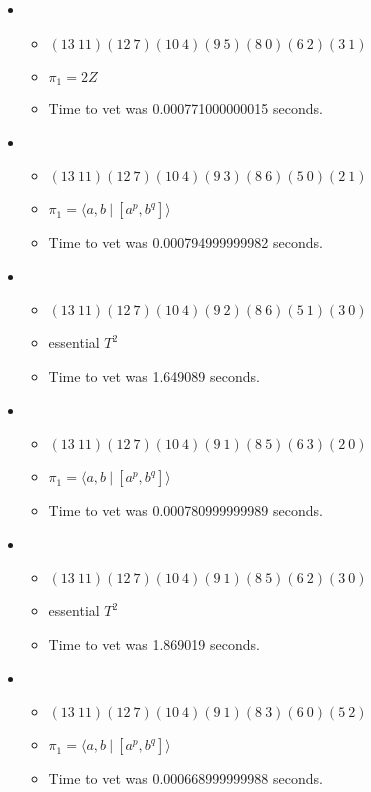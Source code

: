 \documentclass{article}
\begin{document}
\begin{itemize}
\begin{itemize}
\end{itemize}
\item \begin{itemize}
      \item $(13\ 11)(12\ 7)(10\ 4)(9\ 5)(8\ 0)(6\ 2)(3\ 1)$
      \item $\pi_1 =2 Z$
      \item Time to vet was 0.000771000000015 seconds.
\end{itemize}
\item \begin{itemize}
      \item $(13\ 11)(12\ 7)(10\ 4)(9\ 3)(8\ 6)(5\ 0)(2\ 1)$
      \item $\pi_1 = \langle a,b\ |\ [a^p,b^q]\rangle$
      \item Time to vet was 0.000794999999982 seconds.
\end{itemize}
\item \begin{itemize}
      \item $(13\ 11)(12\ 7)(10\ 4)(9\ 2)(8\ 6)(5\ 1)(3\ 0)$
      \item essential $T^2$
      \item Time to vet was 1.649089 seconds.
\end{itemize}
\item \begin{itemize}
      \item $(13\ 11)(12\ 7)(10\ 4)(9\ 1)(8\ 5)(6\ 3)(2\ 0)$
      \item $\pi_1 = \langle a,b\ |\ [a^p,b^q]\rangle$
      \item Time to vet was 0.000780999999989 seconds.
\end{itemize}
\item \begin{itemize}
      \item $(13\ 11)(12\ 7)(10\ 4)(9\ 1)(8\ 5)(6\ 2)(3\ 0)$
      \item essential $T^2$
      \item Time to vet was 1.869019 seconds.
\end{itemize}
\item \begin{itemize}
      \item $(13\ 11)(12\ 7)(10\ 4)(9\ 1)(8\ 3)(6\ 0)(5\ 2)$
      \item $\pi_1 = \langle a,b\ |\ [a^p,b^q]\rangle$
      \item Time to vet was 0.000668999999988 seconds.
\end{itemize}

\end{itemize}
\end{document}
